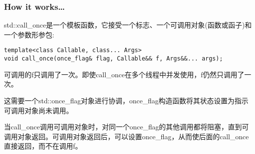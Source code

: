 \subsubsection{How it works…}

std::call\_once是一个模板函数，它接受一个标志、一个可调用对象(函数或函子)和一个参数形参包:

\begin{lstlisting}[style=styleCXX]
template<class Callable, class... Args>
void call_once(once_flag& flag, Callable&& f, Args&&... args);
\end{lstlisting}

可调用的f只调用了一次。即使call\_once在多个线程中并发使用，f仍然只调用了一次。

这需要一个std::once\_flag对象进行协调，once\_flag构造函数将其状态设置为指示可调用对象尚未调用。

当call\_once调用可调用对象时，对同一个once\_flag的其他调用都将阻塞，直到可调用对象返回。可调用对象返回后，可以设置once\_flag，从而使后面的call\_once直接返回，而不在调用f。



















